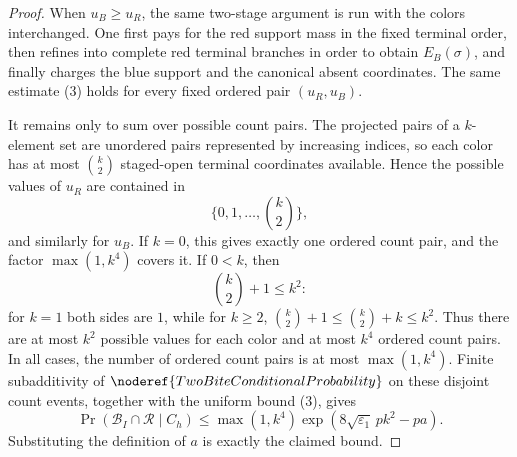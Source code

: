 \begin{proof}
When \(u_B\ge u_R\), the same two-stage argument is run with the colors
interchanged.  One first pays for the red support mass in the fixed terminal
order, then refines into complete red terminal branches in order to obtain
\(E_B(\sigma)\), and finally charges the blue support and the canonical absent
coordinates.  The same estimate (3) holds for every fixed ordered pair
\((u_R,u_B)\).

It remains only to sum over possible count pairs.  The projected pairs of a
\(k\)-element set are unordered pairs represented by increasing indices, so
each color has at most \(\binom{k}{2}\) staged-open terminal coordinates
available.  Hence the possible values of \(u_R\) are contained in
\[
\{0,1,\ldots,\binom{k}{2}\},
\]
and similarly for \(u_B\).  If \(k=0\), this gives exactly one ordered count
pair, and the factor \(\max(1,k^4)\) covers it.  If \(0<k\), then
\[
\binom{k}{2}+1\le k^2:
\]
for \(k=1\) both sides are \(1\), while for \(k\ge2\),
\(\binom{k}{2}+1\le \binom{k}{2}+k\le k^2\).  Thus there are at most \(k^2\)
possible values for each color and at most \(k^4\) ordered count pairs.  In
all cases, the number of ordered count pairs is at most \(\max(1,k^4)\).
Finite subadditivity of \(\noderef{TwoBiteConditionalProbability}\) on these
disjoint count events, together with the uniform bound (3), gives
\[
\Pr(\mathcal B_I\cap\mathcal R\mid C_h)
\le
\max(1,k^4)\exp\!\left(
8\sqrt{\varepsilon_1}\,pk^2-pa\right).
\]
Substituting the definition of \(a\) is exactly the claimed bound.
\end{proof}
